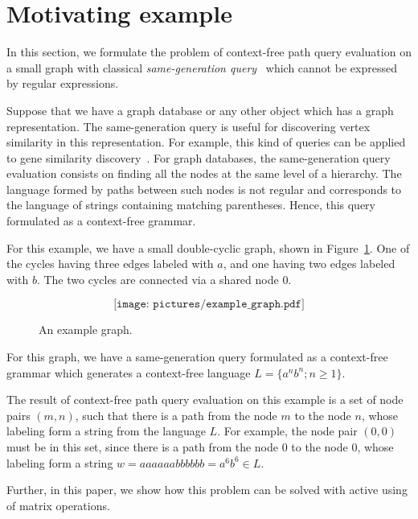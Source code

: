 \section{Motivating example} \label{section_motivating}
In this section, we formulate the problem of context-free path query evaluation on a small graph with classical \textit{same-generation query}~\cite{FndDB} which cannot be expressed by regular expressions.

Suppose that we have a graph database or any other object which has a graph representation. The same-generation query is useful for discovering vertex similarity in this representation. For example, this kind of queries can be applied to gene similarity discovery~\cite{GraphQueryWithEarley}. For graph databases, the same-generation query evaluation consists on finding all the nodes at the same level of a hierarchy. The language formed by paths between such nodes is not regular and corresponds to the language of strings containing matching parentheses. Hence, this query formulated as a context-free grammar.

For this example, we have a small double-cyclic graph, shown in Figure~\ref{Example_Graph}. One of the cycles having three edges labeled with $a$, and one having two edges labeled with $b$. The two cycles are connected via
a shared node $0$.

\begin{figure}[h]
	\[
	\texttt{[image: pictures/example\_graph.pdf]}
	\]
	\caption{An example graph.}
	\label{Example_Graph}
\end{figure}

For this graph, we have a same-generation query formulated as a context-free grammar which generates a context-free language $L=\{a^n b^n; n \geq 1\}$.

The result of context-free path query evaluation on this example is a set of node pairs $(m, n)$, such that there is a path from the node $m$ to the node $n$, whose labeling form a string from the language $L$. For example, the node pair $(0,0)$ must be in this set, since there is a path from the node $0$ to the node $0$, whose labeling form a string $w = aaaaaabbbbbb = a^6b^6 \in L$.

Further, in this paper, we show how this problem can be solved with active using of matrix operations.